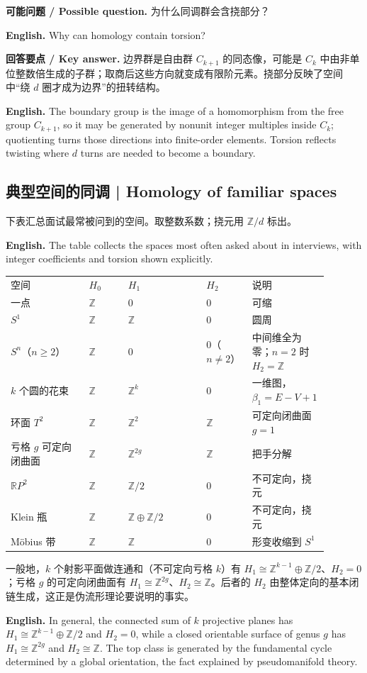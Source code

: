 \documentclass[UTF8,11pt,a4paper]{ctexart}
\newcommand{\EN}[1]{\par\noindent\textbf{English.} #1\par}
\newcommand{\ASK}[4]{\par\noindent\textbf{可能问题 / Possible question.} #1\par\EN{#2}\noindent\textbf{回答要点 / Key answer.} #3\par\EN{#4}\medskip}
\begin{document}
\ASK{为什么同调群会含挠部分？}{Why can homology contain torsion?}{边界群是自由群 $C_{k+1}$ 的同态像，可能是 $C_k$ 中由非单位整数倍生成的子群；取商后这些方向就变成有限阶元素。挠部分反映了空间中“绕 $d$ 圈才成为边界”的扭转结构。}{The boundary group is the image of a homomorphism from the free group $C_{k+1}$, so it may be generated by nonunit integer multiples inside $C_k$; quotienting turns those directions into finite-order elements. Torsion reflects twisting where $d$ turns are needed to become a boundary.}

\subsection{典型空间的同调 | Homology of familiar spaces}
\noindent 下表汇总面试最常被问到的空间。取整数系数；挠元用 $\mathbb Z/d$ 标出。
\EN{The table collects the spaces most often asked about in interviews, with integer coefficients and torsion shown explicitly.}
\begin{center}
\small
\setlength{\tabcolsep}{4pt}
\begin{tabular}{p{0.24\linewidth}p{0.12\linewidth}p{0.24\linewidth}p{0.14\linewidth}p{0.15\linewidth}}
空间 & $H_0$ & $H_1$ & $H_2$ & 说明\\
一点 & $\mathbb Z$ & $0$ & $0$ & 可缩\\
$S^1$ & $\mathbb Z$ & $\mathbb Z$ & $0$ & 圆周\\
$S^n$（$n\ge2$） & $\mathbb Z$ & $0$ & $0$（$n\ne2$） & 中间维全为零；$n=2$ 时 $H_2=\mathbb Z$\\
$k$ 个圆的花束 & $\mathbb Z$ & $\mathbb Z^k$ & $0$ & 一维图，$\beta_1=E-V+1$\\
环面 $T^2$ & $\mathbb Z$ & $\mathbb Z^2$ & $\mathbb Z$ & 可定向闭曲面 $g=1$\\
亏格 $g$ 可定向闭曲面 & $\mathbb Z$ & $\mathbb Z^{2g}$ & $\mathbb Z$ & 把手分解\\
$\mathbb R P^2$ & $\mathbb Z$ & $\mathbb Z/2$ & $0$ & 不可定向，挠元\\
Klein 瓶 & $\mathbb Z$ & $\mathbb Z\oplus\mathbb Z/2$ & $0$ & 不可定向，挠元\\
Möbius 带 & $\mathbb Z$ & $\mathbb Z$ & $0$ & 形变收缩到 $S^1$\\
\end{tabular}
\end{center}

\noindent 一般地，$k$ 个射影平面做连通和（不可定向亏格 $k$）有 $H_1\cong\mathbb Z^{k-1}\oplus\mathbb Z/2$、$H_2=0$；亏格 $g$ 的可定向闭曲面有 $H_1\cong\mathbb Z^{2g}$、$H_2\cong\mathbb Z$。后者的 $H_2$ 由整体定向的基本闭链生成，这正是伪流形理论要说明的事实。
\EN{In general, the connected sum of $k$ projective planes has $H_1\cong\mathbb Z^{k-1}\oplus\mathbb Z/2$ and $H_2=0$, while a closed orientable surface of genus $g$ has $H_1\cong\mathbb Z^{2g}$ and $H_2\cong\mathbb Z$. The top class is generated by the fundamental cycle determined by a global orientation, the fact explained by pseudomanifold theory.}
\end{document}

